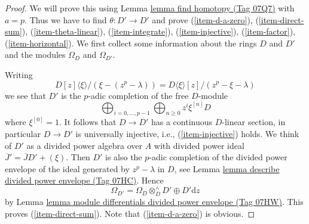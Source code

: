 \documentclass{amsart}
\theoremstyle{plain}
\theoremstyle{definition}
\theoremstyle{remark}
\numberwithin{equation}{subsection}
\begin{document}
\begin{proof}
We will prove this using Lemma \href{https://stacks.math.columbia.edu/tag/07Q7}{lemma find homotopy (Tag 07Q7)} with $a = p$.
Thus we have to find $\theta : D' \to D'$ and prove
(\ref{item-d-a-zero}), (\ref{item-direct-sum}), (\ref{item-theta-linear}),
(\ref{item-integrate}), (\ref{item-injective}), (\ref{item-factor}),
(\ref{item-horizontal}). We first collect some information about the rings
$D$ and $D'$ and the modules $\Omega_D$ and $\Omega_{D'}$.

\medskip\noindent
Writing
$$
D[z]\langle \xi \rangle/(\xi - (z^p - \lambda))
=
D\langle \xi \rangle[z]/(z^p - \xi - \lambda)
$$
we see that $D'$ is the $p$-adic completion of the free $D$-module
$$
\bigoplus\nolimits_{i = 0, \ldots, p - 1}
\bigoplus\nolimits_{n \geq 0}
z^i \xi^{[n]} D
$$
where $\xi^{[0]} = 1$.
It follows that $D \to D'$ has a continuous $D$-linear section, in particular
$D \to D'$ is universally injective, i.e., (\ref{item-injective}) holds.
We think of $D'$ as a divided power algebra
over $A$ with divided power ideal $\overline{J}' = \overline{J}D' + (\xi)$.
Then $D'$ is also the $p$-adic completion of the divided power envelope
of the ideal generated by $z^p - \lambda$ in $D$, see
Lemma \href{https://stacks.math.columbia.edu/tag/07HC}{lemma describe divided power envelope (Tag 07HC)}. Hence
$$
\Omega_{D'} = \Omega_D \otimes_D^\wedge D' \oplus D'\text{d}z
$$
by Lemma \href{https://stacks.math.columbia.edu/tag/07HW}{lemma module differentials divided power envelope (Tag 07HW)}.
This proves (\ref{item-direct-sum}). Note that (\ref{item-d-a-zero})
is obvious.


\end{proof}
\end{document}
